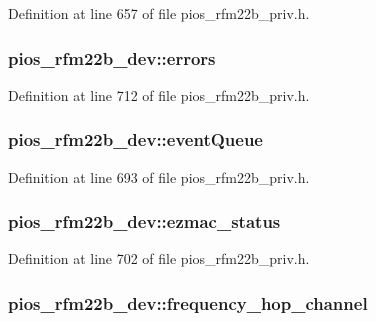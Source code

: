 Definition at line 657 of file pios\-\_\-rfm22b\-\_\-priv.\-h.

\hypertarget{structpios__rfm22b__dev_a538dcdf62ddc3430e172d88eb252dc0d}{
\subsubsection[{errors}]{ pios\-\_\-rfm22b\-\_\-dev\-::errors}}\label{structpios__rfm22b__dev_a538dcdf62ddc3430e172d88eb252dc0d}


Definition at line 712 of file pios\-\_\-rfm22b\-\_\-priv.\-h.

\hypertarget{structpios__rfm22b__dev_a0c5971f25ea4ab50328105098e54eda7}{
\subsubsection[{event\-Queue}]{ pios\-\_\-rfm22b\-\_\-dev\-::event\-Queue}}\label{structpios__rfm22b__dev_a0c5971f25ea4ab50328105098e54eda7}


Definition at line 693 of file pios\-\_\-rfm22b\-\_\-priv.\-h.

\hypertarget{structpios__rfm22b__dev_ae89edb5d4197faaeab67b5f0b010f5f8}{
\subsubsection[{ezmac\-\_\-status}]{ pios\-\_\-rfm22b\-\_\-dev\-::ezmac\-\_\-status}}\label{structpios__rfm22b__dev_ae89edb5d4197faaeab67b5f0b010f5f8}


Definition at line 702 of file pios\-\_\-rfm22b\-\_\-priv.\-h.

\hypertarget{structpios__rfm22b__dev_a27f8f42b03439de7810e39e4240cc9dc}{
\subsubsection[{frequency\-\_\-hop\-\_\-channel}]{ pios\-\_\-rfm22b\-\_\-dev\-::frequency\-\_\-hop\-\_\-channel}}\label{structpios__rfm22b__dev_a27f8f42b03439de7810e39e4240cc9dc}


